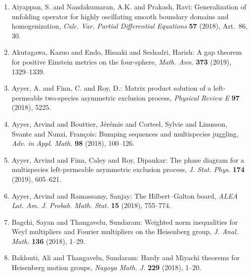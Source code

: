 \medskip

\medskip

\vspace{-2.5mm}
\begin{enumerate}[leftmargin=27pt]

	\item Aiyappan, S. and Nandakumaran, A.K. and Prakash, Ravi: Generalization of unfolding operator for highly oscillating
	      smooth boundary domains and homogenization, {\em Calc. Var. Partial Differential Equations} {\bf 57} (2018), Art.~86, 30.

	\item Akutagawa, Kazuo and Endo, Hisaaki and Seshadri, Harish: A gap theorem for positive {E}instein metrics on the
	      four-sphere, {\em Math. Ann.} {\bf 373} (2019), 1329--1339.

	\item\label{ayyer:exclusion-process} Ayyer, A. and Finn, C. and Roy, D.: Matrix product solution of a left-permeable two-species asymmetric exclusion process, {\em Physical Review E} {\bf 97} (2018), 5225.

	\item\label{ayyer:multispecies-juggling} Ayyer, Arvind and Bouttier, J\'{e}r\'{e}mie and Corteel, Sylvie and
	      Linusson, Svante and Nunzi, Fran\c{c}ois: Bumping sequences and multispecies juggling, {\em Adv. in Appl. Math.} {\bf 98} (2018), 100--126.

	\item   Ayyer, Arvind and Finn, Caley and Roy, Dipankar: The phase diagram for a multispecies left-permeable asymmetric
	      exclusion process, {\em J. Stat. Phys.} {\bf 174} (2019), 605--621.

	\item\label{ayyer:Hilbert-Galton} Ayyer, Arvind and Ramassamy, Sanjay: The {H}ilbert--{G}alton board, {\em ALEA Lat. Am. J. Probab. Math. Stat.} {\bf 15} (2018), 755--774.

	\item Bagchi, Sayan and  Thangavelu, Sundaram: Weighted norm inequalities for {W}eyl multipliers and Fourier multipliers on the {H}eisenberg group, {\em J. Anal. Math.} {\bf 136} (2018), 1--29.

	\item Baklouti, Ali and Thangavelu, Sundaram: Hardy and {M}iyachi theorems for {H}eisenberg motion groups, {\em Nagoya Math. J.} {\bf 229} (2018), 1--20.


\end{enumerate}
